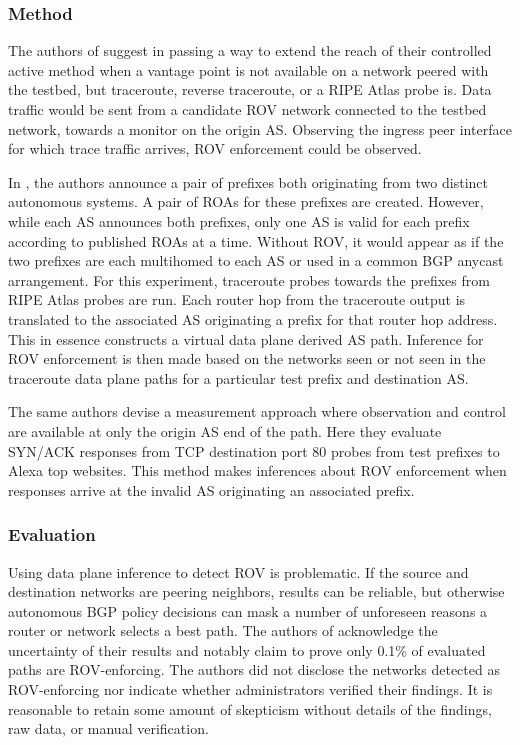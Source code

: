 \documentclass[sigconf]{acmart}
\begin{document}
\subsubsection{Method}

The authors of \cite{reuter_towards_2018} suggest in passing a way to
extend the reach of their controlled active method when a vantage point
is not available on a network peered with the testbed, but traceroute,
reverse traceroute, or a RIPE Atlas probe
is.\cite{katz-bassett_reverse_2010}\cite{ripe_ncc_staff_ripe_2015} Data
traffic would be sent from a candidate ROV network connected to the
testbed network, towards a monitor on the origin AS.  Observing the
ingress peer interface for which trace traffic arrives, ROV enforcement
could be observed.

In \cite{hlavacek_practical_2018}, the authors announce a pair of
prefixes both originating from two distinct autonomous systems.  A pair
of ROAs for these prefixes are created.  However, while each AS
announces both prefixes, only one AS is valid for each prefix according
to published ROAs at a time.  Without ROV, it would appear as if the two
prefixes are each multihomed to each AS or used in a common BGP anycast
arrangement.  For this experiment, traceroute probes towards the
prefixes from RIPE Atlas probes are run.  Each router hop from the
traceroute output is translated to the associated AS originating a
prefix for that router hop address.  This in essence constructs a
virtual data plane derived AS path.  Inference for ROV enforcement is
then made based on the networks seen or not seen in the traceroute data
plane paths for a particular test prefix and destination AS.

The same authors devise a measurement approach where observation and
control are available at only the origin AS end of the path.   Here they
evaluate SYN/ACK responses from TCP destination port 80 probes from test
prefixes to Alexa top websites.\cite{noauthor_alexa_2018}  This method
makes inferences about ROV enforcement when responses arrive at the
invalid AS originating an associated prefix.

\subsubsection{Evaluation}

Using data plane inference to detect ROV is problematic.  If the source
and destination networks are peering neighbors, results can be reliable,
but otherwise autonomous BGP policy decisions can mask a number of
unforeseen reasons a router or network selects a best path.  The authors
of \cite{hlavacek_practical_2018} acknowledge the uncertainty of their
results and notably claim to prove only 0.1\% of evaluated paths are
ROV-enforcing.  The authors did not disclose the networks detected as
ROV-enforcing nor indicate whether administrators verified their
findings.  It is reasonable to retain some amount of skepticism without
details of the findings, raw data, or manual verification.
\end{document}
